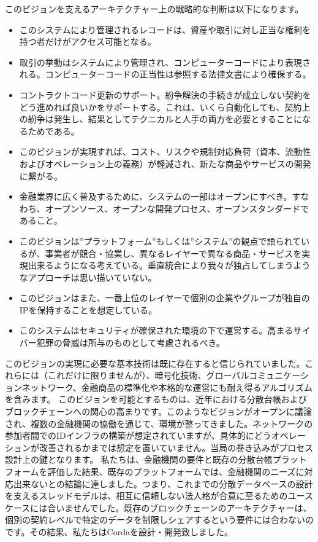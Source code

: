 \documentclass{article}
\begin{document}
このビジョンを支えるアーキテクチャー上の戦略的な判断は以下になります。
\begin{itemize}
\item このシステムにより管理されるレコードは、資産や取引に対し正当な権利を持つ者だけがアクセス可能となる。
\item 取引の挙動はシステムにより管理され、コンピューターコードにより表現される。コンピューターコードの正当性は参照する法律文書により確保する。\cite{Ricardian}
\item コントラクトコード更新のサポート。紛争解決の手続きが成立しない契約をどう進めれば良いかをサポートする。これは、いくら自動化しても、契約上の紛争は発生し、結果としてテクニカルと人手の両方を必要とすることになるためである。
\item このビジョンが実現すれば、コスト、リスクや規制対応負荷（資本、流動性およびオペレーション上の義務）が軽減され、新たな商品やサービスの開発に繋がる。
\item 金融業界に広く普及するために、システムの一部はオープンにすべき。すなわち、オープンソース、オープンな開発プロセス、オープンスタンダードであること。
\item このビジョンは”プラットフォーム”もしくは”システム”の観点で語られているが、事業者が競合・協業し、異なるレイヤーで異なる商品・サービスを実現出来るようになる考えている。垂直統合により我々が独占してしまうようなアプローチは思い描いていない。
\item このビジョンはまた、一番上位のレイヤーで個別の企業やグループが独自のIPを保持することを想定している。
\item このシステムはセキュリティが確保された環境の下で運営する。高まるサイバー犯罪の脅威は所与のものとして考慮されるべき。
\end{itemize}
このビジョンの実現に必要な基本技術は既に存在すると信じられていました。これらには（これだけに限りませんが）、暗号化技術、グローバルコミュニケーションネットワーク、金融商品の標準化や本格的な運営にも耐え得るアルゴリズムを含みます。
このビジョンを可能とするものは、近年における分散台帳およびブロックチェーンへの関心の高まりです。このようなビジョンがオープンに議論され、複数の金融機関の協働を通じて、環境が整ってきました。ネットワークの参加者間でのIDインフラの構築が想定されていますが、具体的にどうオペレーションが改善されるかまでは想定を置いていません。当局の巻き込みがプロセス設計上の鍵となります。
私たちは、金融機関の要件と既存の分散台帳プラットフォームを評価した結果、既存のプラットフォームでは、金融機関のニーズに対応出来ないとの結論に達しました。つまり、これまでの分散データベースの設計を支えるスレッドモデルは、相互に信頼しない法人格が合意に至るためのユースケースには合いませんでした。既存のブロックチェーンのアーキテクチャーは、個別の契約レベルで特定のデータを制限しシェアするという要件には合わないのです。その結果、私たちはCordaを設計・開発致しました。
\end{document}
